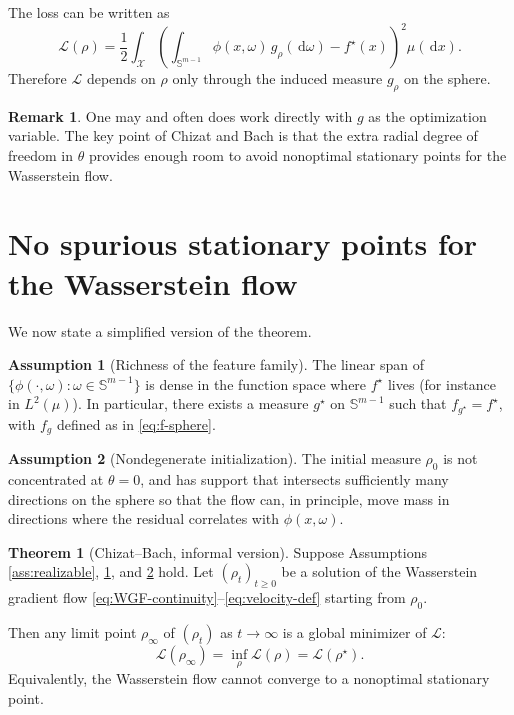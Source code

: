 \documentclass[11pt]{article}
\numberwithin{equation}{section}
\theoremstyle{definition}
\newtheorem{assumption}{Assumption}[section]
\newtheorem{remark}{Remark}[section]
\newtheorem{theorem}{Theorem}[section]
\newcommand{\dd}{\,\mathrm{d}}
\newcommand{\1}{\mathbbm{1}}
\begin{document}
The loss can be written as
\begin{equation}
\label{eq:loss-g}
\mathcal{L}(\rho)
= \frac{1}{2}\int_{\mathcal{X}}\left(
\int_{\mathbb{S}^{m-1}} \phi(x,\omega)\,g_\rho(\dd\omega)
- f^\star(x)
\right)^2\mu(\dd x).
\end{equation}
Therefore $\mathcal{L}$ depends on $\rho$ only through the induced measure $g_\rho$ on the sphere.

\begin{remark}
One may and often does work directly with $g$ as the optimization variable. The key point of Chizat and Bach is that the extra radial degree of freedom in $\theta$ provides enough room to avoid nonoptimal stationary points for the Wasserstein flow.
\end{remark}

\section{No spurious stationary points for the Wasserstein flow}

We now state a simplified version of the theorem.

\begin{assumption}[Richness of the feature family]
\label{ass:richness}
The linear span of $\{\phi(\cdot,\omega): \omega\in\mathbb{S}^{m-1}\}$ is dense in the function space where $f^\star$ lives (for instance in $L^2(\mu)$). In particular, there exists a measure $g^\star$ on $\mathbb{S}^{m-1}$ such that $f_{g^\star}=f^\star$, with $f_g$ defined as in \eqref{eq:f-sphere}.
\end{assumption}

\begin{assumption}[Nondegenerate initialization]
\label{ass:nondeg-init}
The initial measure $\rho_0$ is not concentrated at $\theta=0$, and has support that intersects sufficiently many directions on the sphere so that the flow can, in principle, move mass in directions where the residual correlates with $\phi(x,\omega)$.
\end{assumption}

\begin{theorem}[Chizat--Bach, informal version]
\label{thm:chizat-bach}
Suppose Assumptions \ref{ass:realizable}, \ref{ass:richness}, and \ref{ass:nondeg-init} hold. Let $(\rho_t)_{t\ge 0}$ be a solution of the Wasserstein gradient flow \eqref{eq:WGF-continuity}--\eqref{eq:velocity-def} starting from $\rho_0$.

Then any limit point $\rho_\infty$ of $(\rho_t)$ as $t\to\infty$ is a global minimizer of $\mathcal{L}$:
\[
\mathcal{L}(\rho_\infty) = \inf_{\rho}\mathcal{L}(\rho) = \mathcal{L}(\rho^\star).
\]
Equivalently, the Wasserstein flow cannot converge to a nonoptimal stationary point.
\end{theorem}
\end{document}
